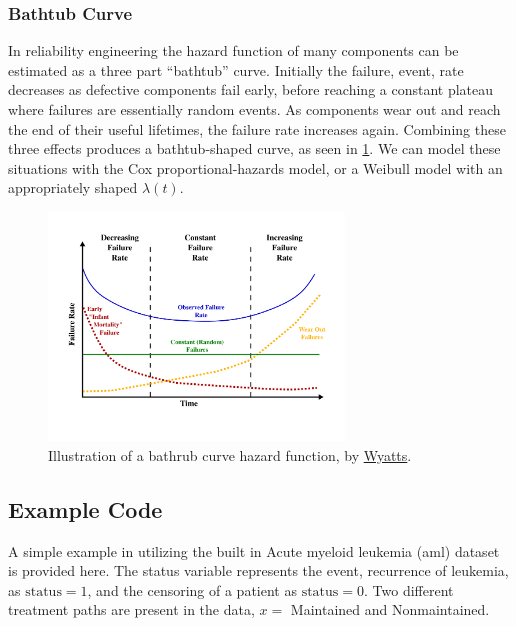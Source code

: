 \subsubsection{Bathtub Curve}
\label{additional:Survival:additional:bathtub}
In reliability engineering the hazard function of many components
can be estimated as a three part ``bathtub'' curve.
Initially the failure, \ie event, rate decreases as defective components fail early,
before reaching a constant plateau where failures are essentially random events.
As components wear out and reach the end of their useful lifetimes, the failure rate increases again.
Combining these three effects produces a bathtub-shaped curve, as seen in \cref{fig:bathtub_curve}.
We can model these situations with the Cox proportional-hazards model,
or a Weibull model with an appropriately shaped $\lambda\left(t\right)$.

\begin{figure}[H]
\centering
\includegraphics[width=0.7\textwidth]{figures/survival/bathtub_curve.pdf}
\vspace{0.2cm}
\caption{
Illustration of a bathrub curve hazard function, by \href{https://en.wikipedia.org/wiki/File:Bathtub_curve.svg}{Wyatts}.
}
\label{fig:bathtub_curve}
\end{figure}

\subsection{Example \R Code}
\label{additional:Survival:Rcode}


A simple example in \R utilizing the built in Acute myeloid leukemia (aml) dataset is provided here.
The status variable represents the event, recurrence of leukemia, as $\text{status}=1$,
and the censoring of a patient as $\text{status}=0$.
Two different treatment paths are present in the data, $x=$ Maintained and Nonmaintained.

